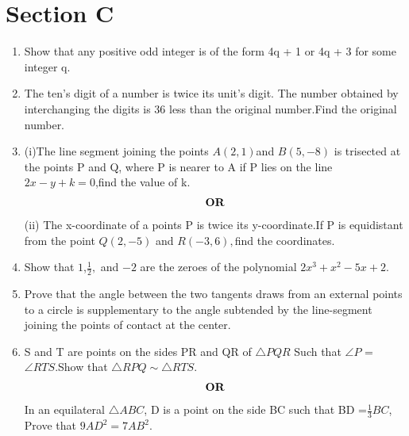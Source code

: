 \documentclass[journal,12pt,twocolumn]{IEEEtran}
\renewcommand\thesection{\arabic{section}}
\begin{document}
\section{Section C}
\renewcommand{\theequation}{\theenumi}
\begin{enumerate}[label=\thesection.\arabic*.,ref=\thesection.\theenumi]
\item Show that any positive odd integer is of the form 4q + 1 or 4q + 3 for some integer q.\\

\item The ten's digit of a number is twice its unit's digit. The number obtained by interchanging the digits is 36 less than the original number.Find the original number.\\

\item (i)The line segment joining the points $A(2,1)$and $B(5,-8)$ is trisected at the points P and Q, where P is nearer to A if P lies on the line $2x-y+k=0$,find the value of k.\\
\begin{align}
    \centering \vec{OR}\nonumber
\end{align}
\newline (ii) The x-coordinate of a points P is twice its y-coordinate.If P is equidistant from the point $Q(2,-5)$ and $R(-3,6),$find the coordinates.\\

\item Show that $1$,$\frac{1}{2},$ and $-2$ are the zeroes of the polynomial $2x^3+x^2-5x+2.$\\

\item Prove that the angle between the two tangents draws from an external points to a circle is supplementary to the angle subtended by the line-segment joining the points of contact at the center.\\

\item S and T are points on the sides PR and QR of $\triangle PQR $ Such that  $\angle P $ = $\angle RTS$.Show that $\triangle RPQ \sim \triangle RTS$.\\ 
\begin{align}
    \centering \vec{OR}\nonumber
\end{align}
In an equilateral $\triangle ABC$, D is a point on the side BC such that BD =$\frac{1}{3}BC$, Prove that $9AD^2 =7AB^2.$\\


\end{enumerate}
\end{document}

